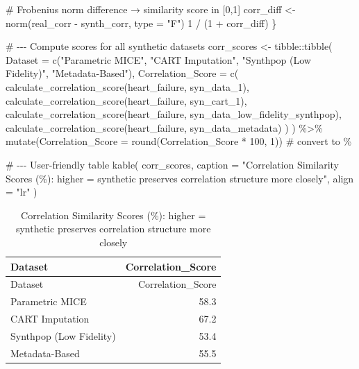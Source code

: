 \documentclass[
  letterpaper,
  DIV=11,
  numbers=noendperiod]{scrartcl}
\newenvironment{Shaded}{\begin{snugshade}}{\end{snugshade}}
\newcommand{\AttributeTok}[1]{\textcolor[rgb]{0.40,0.45,0.13}{#1}}
\newcommand{\CommentTok}[1]{\textcolor[rgb]{0.37,0.37,0.37}{#1}}
\newcommand{\DecValTok}[1]{\textcolor[rgb]{0.68,0.00,0.00}{#1}}
\newcommand{\FunctionTok}[1]{\textcolor[rgb]{0.28,0.35,0.67}{#1}}
\newcommand{\NormalTok}[1]{\textcolor[rgb]{0.00,0.23,0.31}{#1}}
\newcommand{\OtherTok}[1]{\textcolor[rgb]{0.00,0.23,0.31}{#1}}
\newcommand{\SpecialCharTok}[1]{\textcolor[rgb]{0.37,0.37,0.37}{#1}}
\newcommand{\StringTok}[1]{\textcolor[rgb]{0.13,0.47,0.30}{#1}}
\begin{document}
\begin{Shaded}
\begin{Highlighting}[]
  \CommentTok{\# Frobenius norm difference → similarity score in [0,1]}
\NormalTok{  corr\_diff }\OtherTok{\textless{}{-}} \FunctionTok{norm}\NormalTok{(real\_corr }\SpecialCharTok{{-}}\NormalTok{ synth\_corr, }\AttributeTok{type =} \StringTok{"F"}\NormalTok{)}
  \DecValTok{1} \SpecialCharTok{/}\NormalTok{ (}\DecValTok{1} \SpecialCharTok{+}\NormalTok{ corr\_diff)}
\NormalTok{\}}

\CommentTok{\# {-}{-}{-} Compute scores for all synthetic datasets}
\NormalTok{corr\_scores }\OtherTok{\textless{}{-}}\NormalTok{ tibble}\SpecialCharTok{::}\FunctionTok{tibble}\NormalTok{(}
  \AttributeTok{Dataset =} \FunctionTok{c}\NormalTok{(}\StringTok{"Parametric MICE"}\NormalTok{, }\StringTok{"CART Imputation"}\NormalTok{, }\StringTok{"Synthpop (Low Fidelity)"}\NormalTok{, }\StringTok{"Metadata{-}Based"}\NormalTok{),}
  \AttributeTok{Correlation\_Score =} \FunctionTok{c}\NormalTok{(}
    \FunctionTok{calculate\_correlation\_score}\NormalTok{(heart\_failure, syn\_data\_1),}
    \FunctionTok{calculate\_correlation\_score}\NormalTok{(heart\_failure, syn\_cart\_1),}
    \FunctionTok{calculate\_correlation\_score}\NormalTok{(heart\_failure, syn\_data\_low\_fidelity\_synthpop),}
    \FunctionTok{calculate\_correlation\_score}\NormalTok{(heart\_failure, syn\_data\_metadata)}
\NormalTok{  )}
\NormalTok{) }\SpecialCharTok{\%\textgreater{}\%}
  \FunctionTok{mutate}\NormalTok{(}\AttributeTok{Correlation\_Score =} \FunctionTok{round}\NormalTok{(Correlation\_Score }\SpecialCharTok{*} \DecValTok{100}\NormalTok{, }\DecValTok{1}\NormalTok{))   }\CommentTok{\# convert to \%}

\CommentTok{\# {-}{-}{-} User{-}friendly table}
\FunctionTok{kable}\NormalTok{(}
\NormalTok{  corr\_scores,}
  \AttributeTok{caption =} \StringTok{"Correlation Similarity Scores (\%): higher = synthetic preserves correlation structure more closely"}\NormalTok{,}
  \AttributeTok{align =} \StringTok{"lr"}
\NormalTok{)}
\end{Highlighting}
\end{Shaded}

\begin{longtable}[]{@{}lr@{}}
\caption{Correlation Similarity Scores (\%): higher = synthetic
preserves correlation structure more closely}\tabularnewline
\toprule\noalign{}
Dataset & Correlation\_Score \\
\midrule\noalign{}
\endfirsthead
\toprule\noalign{}
Dataset & Correlation\_Score \\
\midrule\noalign{}
\endhead
\bottomrule\noalign{}
\endlastfoot
Parametric MICE & 58.3 \\
CART Imputation & 67.2 \\
Synthpop (Low Fidelity) & 53.4 \\
Metadata-Based & 55.5 \\
\end{longtable}
\end{document}

